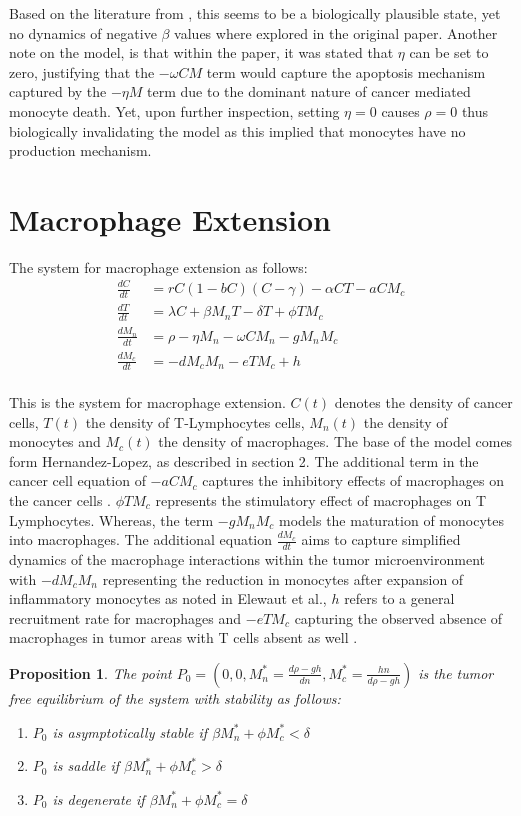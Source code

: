 \documentclass[11pt]{article}
\newtheorem{proposition}{Proposition}
\theoremstyle{definition}
\begin{document}
\noindent Based on the literature from \parencite{DeNardo2019}, this seems to be a biologically plausible state, yet no dynamics of negative $\beta$ values where explored in the original paper. 
Another note on the model, is that within the paper, it was stated that $\eta$ can be set to zero, justifying that the $-\omega CM$ term would capture the apoptosis mechanism captured by the $- \eta M$ term due to the dominant nature of cancer mediated monocyte death. 
Yet, upon further inspection, setting $\eta= 0$ causes $\rho = 0$ thus biologically invalidating the model as this implied that monocytes have no production mechanism.    

\section{Macrophage Extension}
The system for macrophage extension as follows: 
\\
$$
\begin{aligned}
\frac{dC}{dt} &= rC(1-bC)(C-\gamma) - \alpha CT - aCM_c \\
\frac{dT}{dt} &= \lambda C + \beta M_n T - \delta T + \phi T M_c \\
\frac{dM_n}{dt} &= \rho - \eta M_n - \omega CM_n - gM_nM_c \\
\frac{dM_c}{dt} &=  -d M_cM_n - eTM_c + h 
\end{aligned}
$$
\\
This is the system for macrophage extension. $C(t)$ denotes the density of cancer cells, $T(t)$ the density of T-Lymphocytes cells, $M_n(t)$ the density of monocytes and 
$M_c(t)$ the density of macrophages. The base of the model comes form Hernandez-Lopez, as described in section 2. 
The additional term in the cancer cell equation of $-aCM_c$ captures the 
inhibitory effects of macrophages on the cancer cells \parencite{reis2021bringing}.  $\phi T M_c$ represents the stimulatory effect of macrophages on T Lymphocytes.
Whereas, the term $-gM_nM_c$ models the maturation of monocytes into macrophages. The additional equation $\frac{dM_c}{dt}$ aims to capture simplified 
dynamics of the macrophage interactions within the tumor microenvironment with $-d M_cM_n$ representing the reduction in monocytes after expansion of inflammatory monocytes as noted in Elewaut et al., $h$ refers to a 
general recruitment rate for macrophages and $-eTM_c$ capturing the observed absence of macrophages in tumor areas with T cells absent as well \parencite{El2024}. 
\\
\begin{proposition}
  The point \(P_0 = \left( 0, 0, M_n^* =\frac{d\rho - gh}{dn}, M_c^* =\frac{hn}{d\rho - gh} \right)\) is the tumor free equilibrium of the system with 
  stability as follows: 
  \begin{enumerate}
    \item $P_0$ is asymptotically stable if \(\beta M_n^* + \phi M_c^* < \delta\)
    \item $P_0$ is saddle if \(\beta M_n^* + \phi M_c^* > \delta\)
    \item $P_0$ is degenerate if \(\beta M_n^* + \phi M_c^* = \delta\)
  \end{enumerate}
\end{proposition}
\end{document}
